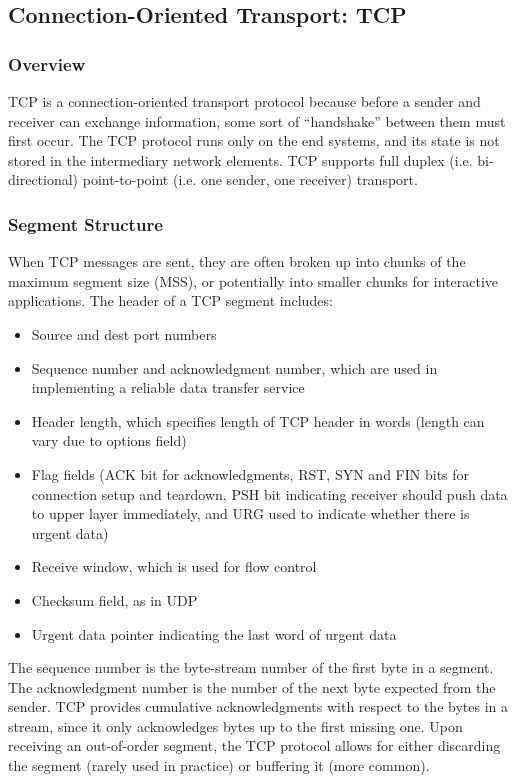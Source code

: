 \documentclass[12pt,titlepage]{article}
\begin{document}
    \subsection{Connection-Oriented Transport: TCP}

      \subsubsection{Overview}
        TCP is a connection-oriented transport protocol because before a sender and receiver can exchange information, some sort of ``handshake'' between them must first occur. The TCP
        protocol runs only on the end systems, and its state is not stored in the intermediary network elements. TCP supports full duplex (i.e. bi-directional) point-to-point
        (i.e. one sender, one receiver) transport.

      \subsubsection{Segment Structure}
        When TCP messages are sent, they are often broken up into chunks of the maximum segment size (MSS), or potentially into smaller chunks for interactive applications. The header
        of a TCP segment includes:
        \begin{itemize}
          \item Source and dest port numbers
          \item Sequence number and acknowledgment number, which are used in implementing a reliable data transfer service
          \item Header length, which specifies length of TCP header in words (length can vary due to options field)
          \item Flag fields (ACK bit for acknowledgments, RST, SYN and FIN bits for connection setup and teardown, PSH bit indicating receiver should push data to
            upper layer immediately, and URG used to indicate whether there is urgent data)
          \item Receive window, which is used for flow control
          \item Checksum field, as in UDP
          \item Urgent data pointer indicating the last word of urgent data
        \end{itemize}

        The sequence number is the byte-stream number of the first byte in a segment. The acknowledgment number is the number of the next byte expected from the sender. TCP provides
        cumulative acknowledgments with respect to the bytes in a stream, since it only acknowledges bytes up to the first missing one. Upon receiving an out-of-order segment, the 
        TCP protocol allows for either discarding the segment (rarely used in practice) or buffering it (more common).
\end{document}
